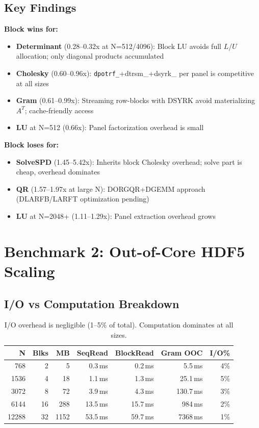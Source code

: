 \documentclass[11pt,a4paper]{article}
\begin{document}
\subsection{Key Findings}

\textbf{Block wins for:}
\begin{itemize}
\item \textbf{Determinant} (0.28--0.32x at N=512/4096): Block LU avoids full $L$/$U$ allocation; only diagonal products accumulated
\item \textbf{Cholesky} (0.60--0.96x): \texttt{dpotrf\_}+dtrsm\_+dsyrk\_ per panel is competitive at all sizes
\item \textbf{Gram} (0.61--0.99x): Streaming row-blocks with DSYRK avoid materializing $A^T$; cache-friendly access
\item \textbf{LU} at N=512 (0.66x): Panel factorization overhead is small
\end{itemize}

\textbf{Block loses for:}
\begin{itemize}
\item \textbf{SolveSPD} (1.45--5.42x): Inherits block Cholesky overhead; solve part is cheap, overhead dominates
\item \textbf{QR} (1.57--1.97x at large N): DORGQR+DGEMM approach (DLARFB/LARFT optimization pending)
\item \textbf{LU} at N=2048+ (1.11--1.29x): Panel extraction overhead grows
\end{itemize}

\section{Benchmark 2: Out-of-Core HDF5 Scaling}

\subsection{I/O vs Computation Breakdown}

\begin{table}[h]
\centering
\small
\begin{tabular}{rrrrrrr}
\toprule
\textbf{N} & \textbf{Blks} & \textbf{MB} & \textbf{SeqRead} & \textbf{BlockRead} & \textbf{Gram OOC} & \textbf{I/O\%} \\
\midrule
768   & 2   & 5     & 0.3\,ms & 0.2\,ms & 5.5\,ms    & 4\% \\
1536  & 4   & 18    & 1.1\,ms & 1.3\,ms & 25.1\,ms   & 5\% \\
3072  & 8   & 72    & 3.9\,ms & 4.3\,ms & 130.7\,ms  & 3\% \\
6144  & 16  & 288   & 13.5\,ms & 15.7\,ms & 984\,ms   & 2\% \\
12288 & 32  & 1152  & 53.5\,ms & 59.7\,ms & 7368\,ms  & 1\% \\
\bottomrule
\end{tabular}
\caption{I/O overhead is negligible (1--5\% of total). Computation dominates at all sizes.}
\end{table}
\end{document}
